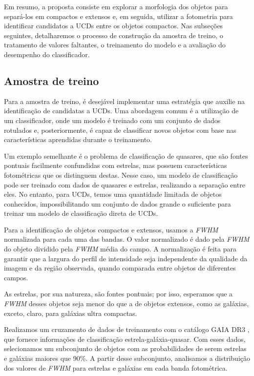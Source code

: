Em resumo, a proposta consiste em explorar a morfologia dos objetos para separá-los em compactos e extensos e, em seguida, utilizar a fotometria para identificar candidatos a UCDs entre os objetos compactos. Nas subseções seguintes, detalharemos o processo de construção da amostra de treino, o tratamento de valores faltantes, o treinamento do modelo e a avaliação do desempenho do classificador.



\subsection{Amostra de treino}\label{subsec:amostra_treino}
Para a amostra de treino, é desejável implementar uma estratégia que auxilie na identificação de candidatas a UCDs. Uma abordagem comum é a utilização de um classificador, onde um modelo é treinado com um conjunto de dados rotulados e, posteriormente, é capaz de classificar novos objetos com base nas características aprendidas durante o treinamento.

Um exemplo semelhante é o problema de classificação de quasares, que são fontes pontuais facilmente confundidas com estrelas, mas possuem características fotométricas que os distinguem destas. Nesse caso, um modelo de classificação pode ser treinado com dados de quasares e estrelas, realizando a separação entre eles. No entanto, para UCDs, temos uma quantidade limitada de objetos conhecidos, impossibilitando um conjunto de dados grande o suficiente para treinar um modelo de classificação direta de UCDs.

Para a identificação de objetos compactos e extensos, usamos a \textit{FWHM} normalizada para cada uma das bandas. O valor normalizado é dado pela \textit{FWHM} do objeto dividido pela \textit{FWHM} média do campo. A normalização é feita para garantir que a largura do perfil de intensidade seja independente da qualidade da imagem e da região observada, quando comparada entre objetos de diferentes campos.

As estrelas, por sua natureza, são fontes pontuais; por isso, esperamos que a \textit{FWHM} desses objetos seja menor do que a de objetos extensos, como as galáxias, exceto, claro, para galáxias ultra compactas.

Realizamos um cruzamento de dados de treinamento com o catálogo GAIA DR3 \citep{GAIA_DR3}, que fornece informações de classificação estrela-galáxia-quasar. Com esses dados, selecionamos um subconjunto de objetos com as probabilidades de serem estrelas e galáxias maiores que 90\%. A partir desse subconjunto, analisamos a distribuição dos valores de \textit{FWHM} para estrelas e galáxias em cada banda fotométrica.

